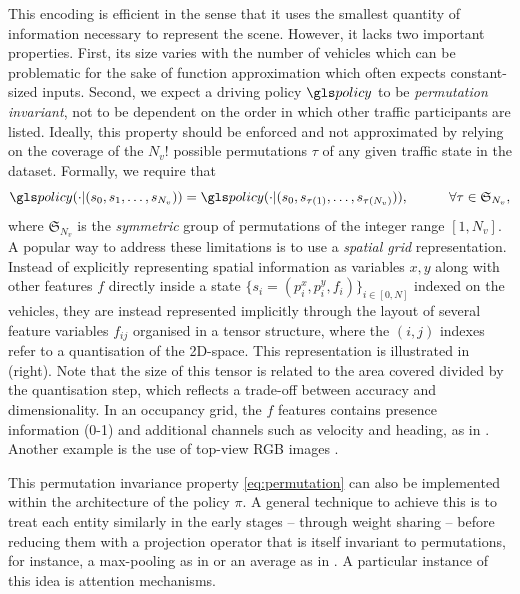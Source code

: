 This encoding is efficient in the sense that it uses the smallest quantity of information necessary to represent the scene. However, it lacks two important properties. First, its size varies with the number of vehicles which can be problematic for the sake of function approximation which often expects constant-sized inputs. Second, we expect a driving policy $\policy$ to be \emph{permutation invariant}, \ie not to be dependent on the order in which other traffic participants are listed. Ideally, this property should be enforced and not approximated by relying on the coverage of the $N_v!$ possible permutations $\tau$ of any given traffic state in the dataset. Formally, we require that
\begin{equation}
\label{eq:permutation}
\policy(\cdot|(s_0, s_1,\dotsc,s_{N_v})) = \policy(\cdot|(s_0, s_{\tau(1)},\dotsc,s_{\tau(N_v)})), \quad\quad\quad \forall\tau \in \mathfrak{S}_{N_v},
\end{equation}
where $\mathfrak{S}_{N_v}$ is the \emph{symmetric} group of permutations of the integer range $[1,N_v]$.
A popular way to address these limitations is to use a \emph{spatial grid} representation. Instead of explicitly representing spatial information as variables $x, y$ along with other features $f$ directly inside a state $\{s_i=(p^x_i,p^y_i,f_i)\}_{i\in[0,N]}$ indexed on the vehicles, they are instead represented implicitly through the layout of several feature variables $f_{ij}$ organised in a tensor structure, where the $(i,j)$ indexes refer to a quantisation of the 2D-space. This representation is illustrated in  (right). Note that the size of this tensor is related to the area covered divided by the quantisation step, which reflects a trade-off between accuracy and dimensionality.
In an occupancy grid, the $f$ features contains presence information (0-1) and additional channels such as velocity and heading, as in \citep[\eg][]{Isele2018, Fridman2018, Bansal2018, Rehder2017c}. Another example is the use of top-view RGB images \citep[\eg][]{Bagnell2010, Rehder2017, Rehder2017c, Liu2018}.


This permutation invariance property \eqref{eq:permutation} can also be implemented within the architecture of the policy $\pi$. A general technique to achieve this is to treat each entity similarly in the early stages -- \eg through weight sharing -- before reducing them with a projection operator that is itself invariant to permutations, for instance, a max-pooling as in \citep{Chen2017,Hoel2018} or an average as in \citep{Qi2016}. A particular instance of this idea is attention mechanisms.


